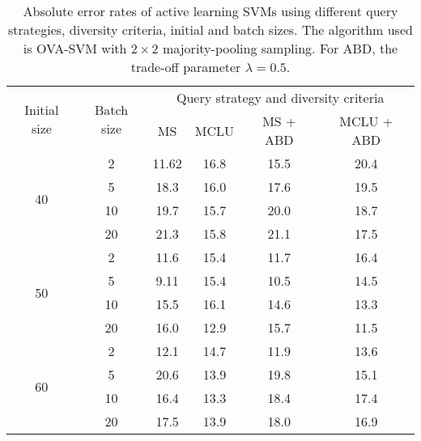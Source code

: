 \begin{table}[ht!]
\centering
\caption{Absolute error rates of active learning SVMs using different query strategies, diversity criteria, initial and batch sizes. The algorithm used is OVA-SVM with  $2 \times 2$ majority-pooling sampling. For ABD, the trade-off parameter  $\lambda = 0.5$. } 
\begin{threeparttable}
\begin{tabular}{ |c| c|c|c|c| c| }
\hline
\multirow{2}{*}{Initial size}  & \multirow{2}{*}{Batch size} &  \multicolumn{4}{c|}{Query strategy and diversity criteria} \\
                                           \cline{3-6}
                                            &                     &   MS    &    MCLU    &    MS + ABD  &  MCLU + ABD   \\
\hline
\multirow{4}{*}{40}             &    2              &  11.62   &  16.8        & 15.5             &  20.4              \\ 
 \cline{2-6}
                                            &    5               &  18.3   & 16.0         & 17.6               &  19.5                      \\
\cline{2-6}
                                            &    10              &  19.7    & 15.7       &  20.0               &  18.7                           \\
\cline{2-6}
                                            &    20               & 21.3   & 15.8        & 21.1                &  17.5 \\
\hline

\multirow{4}{*}{50}             &    2              &  11.6     & 15.4       & 11.7                &  16.4                  \\ 
 \cline{2-6}
                                            &    5               &  9.11    &  15.4      & 10.5                & 14.5            \\
\cline{2-6}
                                            &    10             & 15.5     &  16.1       & 14.6               & 13.3\\
\cline{2-6}
                                            &    20             & 16.0     & 12.9        & 15.7              & 11.5\\
\hline

\multirow{4}{*}{60}             &    2              &12.1         & 14.7     &  11.9              &  13.6                  \\ 
 \cline{2-6}
                                            &    5               & 20.6        & 13.9     &  19.8              & 15.1\\
\cline{2-6}
                                            &    10             & 16.4        & 13.3      & 18.4               & 17.4\\
\cline{2-6}
                                            &    20             & 17.5         & 13.9      & 18.0               & 16.9 \\
\hline


\end{tabular}
\end{threeparttable}
\end{table}
